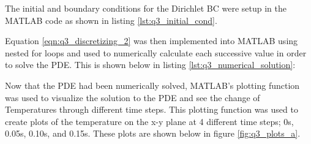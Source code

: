 \documentclass[12pt]{article}
\begin{document}
The initial and boundary conditions for the Dirichlet BC were setup in the MATLAB code as shown in listing \ref{lst:q3_initial_cond}.


                 
Equation \ref{eqn:q3_discretizing_2} was then implemented into MATLAB using nested for loops and used to numerically calculate each successive value in order to solve the PDE. This is shown below in listing \ref{lst:q3_numerical_solution}:




Now that the PDE had been numerically solved, MATLAB's plotting function was used to visualize the solution to the PDE and see the change of Temperatures through different time steps. This plotting function was used to create plots of the temperature on the x-y plane at 4 different time steps; 0s, 0.05s, 0.10s, and 0.15s. These plots are shown below in figure \ref{fig:q3_plots_a}.
\end{document}
